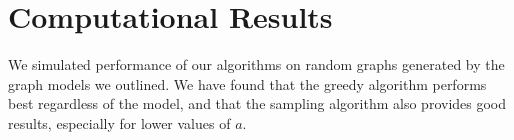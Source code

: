 \section{Computational Results}

We simulated performance of our algorithms on random graphs generated by the graph models we outlined. We have found that the greedy algorithm performs best regardless of the model, and that the sampling algorithm also provides good results, especially for lower values of $a$.